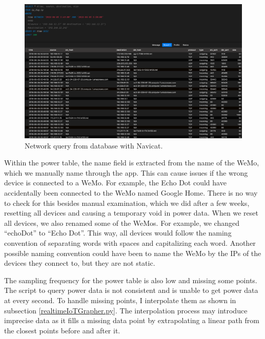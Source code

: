 \begin{figure}[H]
    \centering
    \includegraphics[width=1\textwidth]{figures/navicatNetworkQuery.png}
    \caption{Network query from database with Navicat.}
    \label{fig:navicatNetworkQuery}
\end{figure}
Within the power table, the name field is extracted from the name of the WeMo, which we manually name through the app. This can cause issues if the wrong device is connected to a WeMo. For example, the Echo Dot could have accidentally been connected to the WeMo named Google Home. There is no way to check for this besides manual examination, which we did after a few weeks, resetting all devices and causing a temporary void in power data. When we reset all devices, we also renamed some of the WeMos. For example, we changed ``echoDot'' to ``Echo Dot''. This way, all devices would follow the naming convention of separating words with spaces and capitalizing each word. Another possible naming convention could have been to name the WeMo by the IPs of the devices they connect to, but they are not static.

The sampling frequency for the power table is also low and missing some points. The script to query power data is not consistent and is unable to get power data at every second. To handle missing points, I interpolate them as shown in subsection \ref{realtimeIoTGrapher.py}. The interpolation process may introduce imprecise data as it fills a missing data point by extrapolating a linear path from the closest points before and after it.

